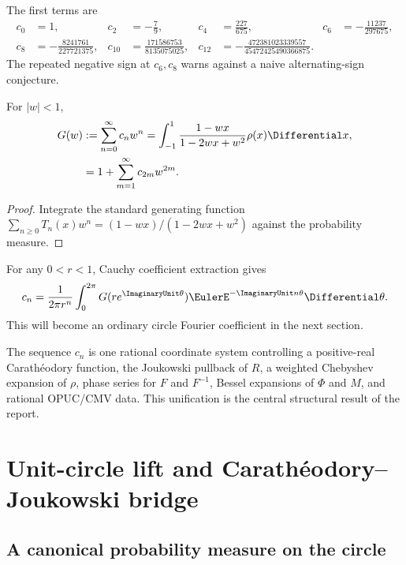 \documentclass[11pt]{article}
\theoremstyle{definition}
\theoremstyle{remark}
\begin{document}
The first terms are
\begin{align*}
 c_0&=1,&c_2&=-\frac79,&c_4&=\frac{227}{675},&c_6&=-\frac{11237}{297675},\\
 c_8&=-\frac{8241761}{227721375},&
 c_{10}&=\frac{171586753}{8135075025},&
 c_{12}&=-\frac{472381023339557}{45472425490366875}.
\end{align*}
The repeated negative sign at \(c_6,c_8\) warns against a naive alternating-sign conjecture.

\begin{proposition}
\label{p7:prop:G-cheb}
For \(|w|<1\),
\begin{align}
 G(w)&:=\sum_{n=0}^{\infty}c_nw^n
 =\int_{-1}^{1}\frac{1-wx}{1-2wx+w^2}\rho(x)\Differential x,
 \label{p7:eq:G-cheb}\\
 &=1+\sum_{m=1}^{\infty}c_{2m}w^{2m}.
 \label{p7:eq:G-even}
\end{align}
\end{proposition}

\begin{proof}
Integrate the standard generating function
\(\sum_{n\ge0}T_n(x)w^n=(1-wx)/(1-2wx+w^2)\) against the probability measure.
\end{proof}

For any \(0<r<1\), Cauchy coefficient extraction gives
\begin{equation}
 c_n=\frac{1}{2\pi r^n}\int_0^{2\pi}G(re^{\ImaginaryUnit\theta})
 \EulerE^{-\ImaginaryUnit n\theta}\Differential\theta.
 \label{p7:eq:c-Cauchy-coefficient}
\end{equation}
This will become an ordinary circle Fourier coefficient in the next section.

\begin{novelbox}
The sequence \(c_n\) is one rational coordinate system controlling a positive-real
Carath\'eodory function, the Joukowski pullback of \(R\), a weighted Chebyshev expansion of
\(\rho\), phase series for \(F\) and \(F^{-1}\), Bessel expansions of \(\Phi\) and \(M\),
and rational OPUC/CMV data. This unification is the central structural result of the report.
\end{novelbox}

\section{Unit-circle lift and Carath\'eodory--Joukowski bridge}
\label{p7:sec:circle}

\subsection{A canonical probability measure on the circle}
\end{document}
